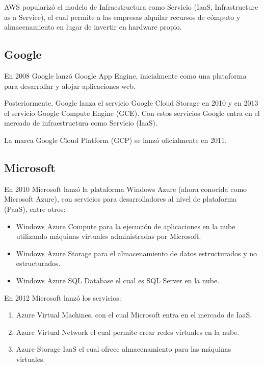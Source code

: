 AWS popularizó el modelo de Infraestructura como Servicio (IaaS, Infrastructure as a Service), el cual permite a las empresas alquilar recursos de cómputo y almacenamiento en lugar de invertir en hardware propio.

\subsection{Google}

En 2008 Google lanzó Google App Engine, inicialmente como una plataforma para desarrollar y alojar aplicaciones web.

Posteriormente, Google lanza el servicio Google Cloud Storage en 2010 y en 2013 el servicio Google Compute Engine (GCE). Con estos servicios Google entra en el mercado de infraestructura como Servicio (IaaS).

La marca Google Cloud Platform (GCP) se lanzó oficialmente en 2011.

\subsection{Microsoft}

En 2010 Microsoft lanzó la plataforma Windows Azure (ahora conocida como Microsoft Azure), con servicios para desarrolladores al nivel de plataforma (PaaS), entre otros:

\begin{itemize}

\item Windows Azure Compute para la ejecución de aplicaciones en la nube utilizando máquinas virtuales administradas por Microsoft.

\item Windows Azure Storage para el almacenamiento de datos estructurados y no estructurados.

\item Windows Azure SQL Database el cual es SQL Server en la nube.

\end{itemize}

En 2012 Microsoft lanzó los servicios:

\begin{enumerate}

\item Azure Virtual Machines, con el cual Microsoft entra en el mercado de IaaS.

\item Azure Virtual Network el cual permite crear redes virtuales en la nube.

\item Azure Storage IaaS el cual ofrece almacenamiento para las máquinas virtuales.

\end{enumerate}

